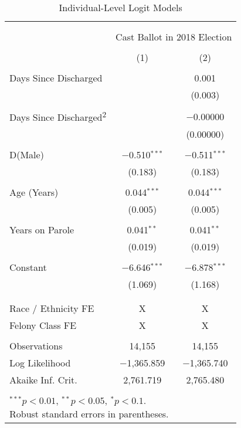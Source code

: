 \documentclass[
  12pt,
]{article}
\begin{document}
\begin{singlespace}

\begin{table}[H] \centering
\fontsize{10}{12}\selectfont
\caption{\label{tab:to-18-logit-short} Individual-Level Logit Models}
\label{}
\begin{tabular}{@{\extracolsep{5pt}}lcc}
\\[-1.8ex]\hline \\[-1.8ex]
\\[-1.8ex] & \multicolumn{2}{c}{Cast Ballot in 2018 Election} \\
\\[-1.8ex] & (1) & (2)\\
\hline \\[-1.8ex]
Days Since Discharged &  & 0.001 \\
&  & (0.003) \\
& & \\
Days Since Discharged\textsuperscript{2} &  & $-$0.00000 \\
&  & (0.00000) \\
& & \\
D(Male) & $-$0.510$^{***}$ & $-$0.511$^{***}$ \\
& (0.183) & (0.183) \\
& & \\
Age (Years) & 0.044$^{***}$ & 0.044$^{***}$ \\
& (0.005) & (0.005) \\
& & \\
Years on Parole & 0.041$^{**}$ & 0.041$^{**}$ \\
& (0.019) & (0.019) \\
& & \\
Constant & $-$6.646$^{***}$ & $-$6.878$^{***}$ \\
& (1.069) & (1.168) \\
& & \\
\hline \\[-1.8ex]
Race / Ethnicity FE & X & X \\
Felony Class FE & X & X \\
\hline \\[-1.8ex]
Observations & 14,155 & 14,155 \\
Log Likelihood & $-$1,365.859 & $-$1,365.740 \\
Akaike Inf. Crit. & 2,761.719 & 2,765.480 \\
\hline \\[-1.8ex]
\multicolumn{3}{l}{\scriptsize{\parbox{.5\linewidth}{\vspace{2pt}$^{***}p<0.01$, $^{**}p<0.05$, $^*p<0.1$. \\Robust standard errors in parentheses.}}}
\end{tabular}
\end{table}

\end{singlespace}
\end{document}
